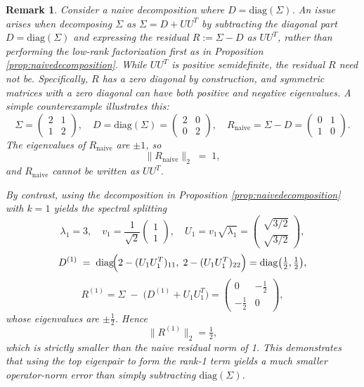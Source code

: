 \documentclass[final,hidelinks,onefignum,onetabnum]{siamart250211}
\providecommand{\diag}{\mathrm{diag}}
\providecommand{\1}{\mathbf{1}}
\newtheorem{rmk}{Remark}[section]
\theoremstyle{plain}
\begin{document}
\begin{rmk}
    Consider a naive decomposition where $D = \text{diag}(\Sigma)$. An issue arises when decomposing $\Sigma$ as $\Sigma = D + UU^{T}$ by subtracting the diagonal part $D = \text{diag}(\Sigma)$ and expressing the residual $R := \Sigma - D$ as $UU^{T}$, rather than performing the low-rank factorization first as in Proposition \ref{prop:naivedecomposition}. While $UU^{T}$ is positive semidefinite, the residual $R$ need not be. Specifically, $R$ has a zero diagonal by construction, and symmetric matrices with a zero diagonal can have both positive and negative eigenvalues. A simple counterexample illustrates this:
    \[
        \Sigma = \begin{pmatrix}2 & 1\\[3pt]1 & 2\end{pmatrix},
        \quad
        D = \diag(\Sigma) = \begin{pmatrix}2 & 0\\[3pt]0 & 2\end{pmatrix},
        \quad
        R_{\mathrm{naive}} = \Sigma - D
        = \begin{pmatrix}0 & 1\\[3pt]1 & 0\end{pmatrix}.
    \]
    The eigenvalues of $R_{\mathrm{naive}}$ are $\pm1$, so
    \[
      \|R_{\mathrm{naive}}\|_{2} \;=\; 1,
    \]
    and $R_{\mathrm{naive}}$ cannot be written as $UU^{T}$.

    By contrast, using the decomposition in Proposition \ref{prop:naivedecomposition} with $k=1$ yields the spectral splitting
    \[
      \lambda_{1}=3,\quad
      v_{1}=\frac1{\sqrt2}\begin{pmatrix}1\\1\end{pmatrix},
      \quad
      U_{1}=v_{1}\sqrt{\lambda_{1}}
            =\begin{pmatrix}\sqrt{3/2}\\[3pt]\sqrt{3/2}\end{pmatrix},
    \]
    \[
      D^{(1)} \;=\;\diag\!\Bigl(2-(U_{1}U_{1}^{T})_{11},\;2-(U_{1}U_{1}^{T})_{22}\Bigr)
             = \diag\bigl(\tfrac12,\tfrac12\bigr),
    \]
    \[
      R^{(1)}
      = \Sigma \;-\;\bigl(D^{(1)} + U_{1}U_{1}^{T}\bigr)
      = \begin{pmatrix}0 & -\tfrac12\\[3pt]-\tfrac12 & 0\end{pmatrix},
    \]
    whose eigenvalues are $\pm\tfrac12$.  Hence
    \[
      \|R^{(1)}\|_{2}
      = \tfrac12,
    \]
    which is strictly smaller than the naive residual norm of 1.  This demonstrates that using the top eigenpair to form the rank‐1 term yields a much smaller operator‐norm error than simply subtracting $\diag(\Sigma)$.
\end{rmk}
\end{document}
